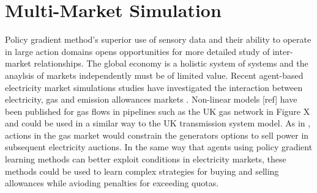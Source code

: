 \section{Multi-Market Simulation}
Policy gradient method's superior use of sensory data and their ability to
operate in large action domains opens opportunities for more detailed study of
inter-market relationships.  The global economy is a holistic system of
systems and the anaylsis of markets independently must be of limited value.
Recent agent-based electricity market simulations studies have investigated the
interaction between electricity, gas and emission allowances markets
\cite{krause:gas,wang:09}.  Non-linear models [ref] have been published for gas
flows in pipelines such as the UK gas network in Figure X and could be used in a
similar way to the UK transmission system model.  As in ,
actions in the gas market would constrain the generators options to sell power
in subsequent electricity auctions.  In the same way that agents using policy
gradient learning methods can better exploit conditions in electricity markets,
these methods could be used to learn complex strategies for buying and selling
allowances while avioding penalties for exceeding quotas.


%
%

